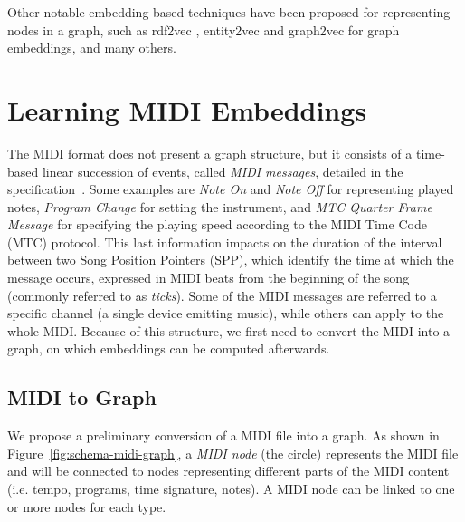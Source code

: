 \documentclass{article}
\newcommand{\figref}[1]{\mbox{Figure~\ref{#1}}}
\begin{document}
Other notable embedding-based techniques have been proposed for representing nodes in a graph, such as rdf2vec \citep{ristoski2018rdf2vec}, entity2vec \citep{palumbo2020entity2rec} and graph2vec \citep{narayanan2017node2vec} for graph embeddings, and many others.

\section{Learning MIDI Embeddings}
\label{sec:embeddings}
The MIDI format does not present a graph structure, but it consists of a time-based linear succession of events, called \textit{MIDI messages}, detailed in the specification~\citep{midispec}. Some examples are \textit{Note On} and \textit{Note Off} for representing played notes, \textit{Program Change} for setting the instrument, and \textit{MTC Quarter Frame Message} for specifying the playing speed according to the MIDI Time Code (MTC) protocol. This last information impacts on the duration of the interval between two Song Position Pointers (SPP), which identify the time at which the message occurs, expressed in MIDI beats from the beginning of the song (commonly referred to as \emph{ticks}). Some of the MIDI messages are referred to a specific channel (a single device emitting music), while others can apply to the whole MIDI. Because of this structure, we first need to convert the MIDI into a graph, on which embeddings can be computed afterwards.

\subsection{MIDI to Graph}
We propose a preliminary conversion of a MIDI file into a graph. As shown in \figref{fig:schema-midi-graph}, a \textit{MIDI node} (the circle) represents the MIDI file and will be connected to nodes representing different parts of the MIDI content (i.e. tempo, programs, time signature, notes). A MIDI node can be linked to one or more nodes for each type.
\end{document}
